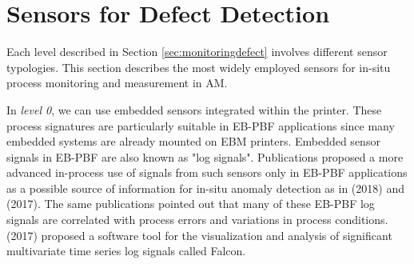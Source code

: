 
\section{Sensors for Defect Detection}
\label{sec:sensors}
Each level described in Section \ref{sec:monitoringdefect} involves different sensor typologies. This section describes the most widely employed sensors for in-situ process monitoring and measurement in AM. 

In \emph{level 0}, we can use embedded sensors integrated within the printer. These process signatures are particularly suitable in EB-PBF applications since many embedded systems are already mounted on EBM printers. Embedded sensor signals in EB-PBF are also known as "log signals". Publications proposed a more advanced in-process use of signals from such sensors only in EB-PBF applications as a possible source of information for in-situ anomaly detection as in \citeauthor{grasso_data_2018} (2018) and \citeauthor{steed_falcon_2017} (2017). The same publications pointed out that many of these EB-PBF log signals are correlated with process errors and variations in process conditions. \citeauthor{steed_falcon_2017} (2017) proposed a software tool for the visualization and analysis of significant multivariate time series log signals called Falcon. 

